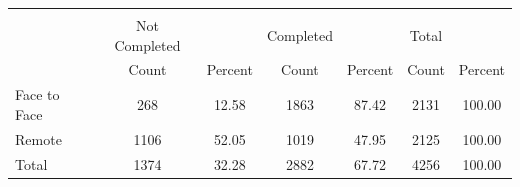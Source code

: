 {
\def\sym#1{\ifmmode^{#1}\else\(^{#1}\)\fi}
\begin{tabular}{l*{3}{cc}}
\hline\hline
            &\multicolumn{6}{c}{}                                                                           \\
            &  Not Completed&               &      Completed&               &          Total&               \\
            &          Count&        Percent&          Count&        Percent&          Count&        Percent\\
\hline
Face to Face&            268&          12.58&           1863&          87.42&           2131&         100.00\\
Remote      &           1106&          52.05&           1019&          47.95&           2125&         100.00\\
Total       &           1374&          32.28&           2882&          67.72&           4256&         100.00\\
\hline\hline
\end{tabular}
}
